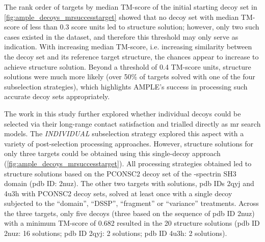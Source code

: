 The rank order of targets by median TM-score of the initial starting decoy set in \cref{fig:ample_decoys_mrsuccesstarget} showed that no decoy set with median TM-score of less than 0.3 score units led to structure solution; however, only two such cases existed in the dataset, and therefore this threshold may only serve as indication. With increasing median TM-score, i.e. increasing similarity between the decoy set and its reference target structure, the chances appear to increase to achieve structure solution. Beyond a threshold of 0.4 TM-score units, structure solutions were much more likely (over 50\% of targets solved with one of the four subselection strategies), which highlights AMPLE's success in processing such accurate decoy sets appropriately.

The work in this study further explored whether individual decoys could be selected via their long-range contact satisfaction and trialled directly as \gls{mr} search models. The \textit{INDIVIDUAL} subselection strategy explored this aspect with a variety of post-selection processing approaches. However, structure solutions for only three targets could be obtained using this single-decoy approach (\cref{fig:ample_decoys_mrsuccesstarget}). All processing strategies obtained led to structure solutions based on the PCONSC2 decoy set of the \textalpha-spectrin SH3 domain (\gls{pdb} ID: 2nuz). The other two targets with solutions, \gls{pdb} IDs 2qyj and 4u3h with PCONSC2 decoy sets, solved at least once with a single decoy subjected to the ``domain'', ``DSSP'', ``fragment'' or ``variance'' treatments. Across the three targets, only five decoys (three based on the sequence of \gls{pdb} ID 2nuz) with a minimum TM-score of 0.682 resulted in the 20 structure solutions (\gls{pdb} ID 2nuz: 16 solutions; \gls{pdb} ID 2qyj: 2 solutions; \gls{pdb} ID 4u3h: 2 solutions).

